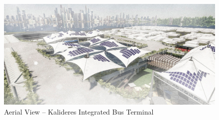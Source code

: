 ﻿%
\begin{figure}[H]
	\centering
	\includegraphics[width=\linewidth]{src/graphics/kalideres-integrated-bus-terminal--perspective-aerial.jpg}
	\caption*{%
		Aerial View -- Kalideres Integrated Bus Terminal
	}
	\label{
		fig:kalideres-integrated-bus-terminal--perspective-aerial
	}
\end{figure}
